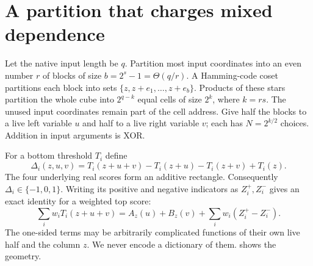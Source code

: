 \documentclass[11pt,letterpaper]{article}
\theoremstyle{definition}
\theoremstyle{remark}
\begin{document}
\section{A partition that charges mixed dependence}
\label{sec:stars-overview}

Let the native input length be $q$. Partition most input coordinates
into an even number $r$ of blocks of size $b=2^s-1=\Theta(q/r)$.
A Hamming-code coset partitions each block into sets
$\{z,z+e_1,\ldots,z+e_b\}$. Products of these stars partition the
whole cube into $2^{q-k}$ equal cells of size $2^k$, where $k=rs$.
The unused input coordinates remain part of the cell address. Give half
the blocks to a live left variable $u$ and half to a live right variable
$v$; each has $N=2^{k/2}$ choices. Addition in input arguments is XOR.

For a bottom threshold $T_i$ define
\[
\Delta_i(z,u,v)=T_i(z+u+v)-T_i(z+u)-T_i(z+v)+T_i(z).
\]
The four underlying real scores form an additive rectangle.
Consequently $\Delta_i\in\{-1,0,1\}$. Writing its positive and
negative indicators as $Z_i^+,Z_i^-$ gives an exact identity for a
weighted top score:
\begin{equation}
\sum_i w_iT_i(z+u+v)
=A_z(u)+B_z(v)+\sum_i w_i(Z_i^+-Z_i^-).
\label{eq:mixed-score}
\end{equation}
The one-sided terms may be arbitrarily complicated functions of their
own live half and the column $z$. We never encode a dictionary of them.
 shows the geometry.
\end{document}
